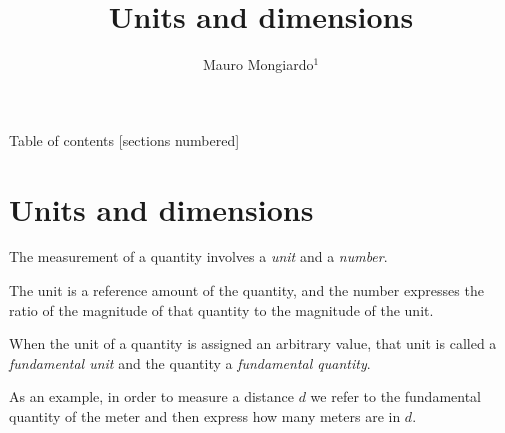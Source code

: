 \documentclass[10pt]{beamer}
\title{Units and dimensions}
\date{}
\author{ Mauro Mongiardo$^1$}
\institute{ $^1$ Department of Engineering, University of Perugia, Perugia, Italy.
}
\begin{document}
\maketitle

\begin{frame}{Table of contents}
  [sections numbered]
  \tableofcontents[hideallsubsections]
\end{frame}

\section{Units and dimensions}
%
\begin{frame}[fragile]{}

The measurement of a quantity involves a \alert{\emph{unit}} and a \alert{\emph{number}}.

The unit is a reference amount of the quantity, and the number expresses the ratio of the magnitude of that quantity to the magnitude of the unit.

When the unit of a quantity is assigned an arbitrary value, that unit is called a \alert{\emph{fundamental unit}} and the quantity a \alert{\emph{fundamental quantity}}.

As an example, in order to measure a distance $d$ we refer to the fundamental quantity of the meter and then express how many meters are in $d$.




\end{frame}
\end{document}
